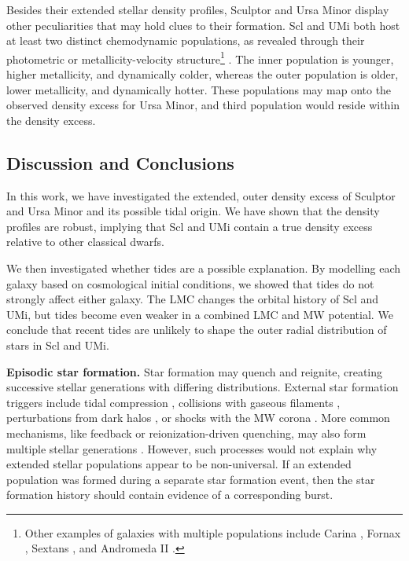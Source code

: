\documentclass{aa}
\makeatletter
\DeclareRobustCommand\citepos
  {\begingroup
   \let\NAT@nmfmt\NAT@posfmt%
   \NAT@swafalse\let\NAT@ctype\z@\NAT@partrue
   \@ifstar{\NAT@fulltrue\NAT@citetp}{\NAT@fullfalse\NAT@citetp}}
\let\NAT@orig@nmfmt\NAT@nmfmt
\def\NAT@posfmt#1{\NAT@orig@nmfmt{#1's}}
\makeatother
\begin{document}
Besides their extended stellar density profiles, Sculptor and Ursa Minor
display other peculiarities that may hold clues to their formation. Scl
and UMi both host at least two distinct chemodynamic populations, as
revealed through their photometric or metallicity-velocity
structure\footnote{Other examples of galaxies with multiple populations
  include Carina \citep{battaglia+2012, fabrizio+2016, kordopatis+2016},
  Fornax
  \citep{battaglia+2006, amorisco+evans2012, delpino+aparicio+hidalgo2015},
  Sextans
  \citep{battaglia+2011, cicuendez+battaglia2018, roederer+2023}, and
  Andromeda II
  \citep{mcconnachie+arimoto+irwin2007, ho+2012, delpino+2017}.}
\citep{tolstoy+2004, battaglia+2008, pace+2020}. The inner population is
younger, higher metallicity, and dynamically colder, whereas the outer
population is older, lower metallicity, and dynamically hotter.
These populations may map onto the observed density excess for Ursa Minor, and \citepos{arroyo-polonio+2024} third population would reside within the density excess.


\subsection{Discussion and Conclusions}\label{sec:stellar_halos}
In this work, we have investigated the extended, outer density excess
of Sculptor and Ursa Minor and its possible tidal origin. We have shown
that the density profiles are robust, implying that Scl and UMi contain
a true density excess relative to other classical dwarfs.

We then investigated whether tides are a possible explanation. By
modelling each galaxy based on cosmological initial conditions, we
showed that tides do not strongly affect either galaxy. The LMC changes
the orbital history of Scl and UMi, but tides become even weaker in a
combined LMC and MW potential. We conclude that recent tides are
unlikely to shape the outer radial distribution of stars in Scl and UMi.

\textbf{Episodic star formation.} Star formation may quench and
reignite, creating successive stellar generations with differing
distributions. External star formation triggers include tidal
compression \citep{mayer+2001a, dong+lin+murray2003}, collisions with
gaseous filaments \citep{genina+2019}, perturbations from dark halos
\citep{starkenburg+helmi+sales2016}, or shocks with the MW corona
\citep{wright+2019}. More common mechanisms, like feedback or
reionization-driven quenching, may also form multiple stellar
generations
\citep{kawata+2006, benitez-llambay+2015, revaz+jablonka2018}. However,
such processes would not explain why extended stellar populations appear
to be non-universal. If an extended population was formed during a
separate star formation event, then the star formation history should
contain evidence of a corresponding burst.
\end{document}
